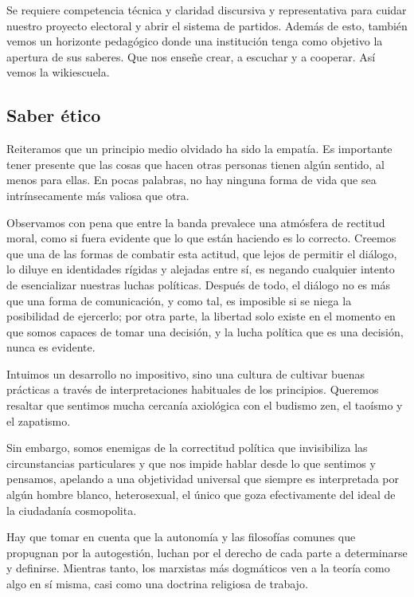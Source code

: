 Se requiere competencia técnica y claridad discursiva y representativa
para cuidar nuestro proyecto electoral y abrir el sistema de partidos.
Además de esto, también vemos un horizonte pedagógico donde una
institución tenga como objetivo la apertura de sus saberes. Que nos
enseñe crear, a escuchar y a cooperar. Así vemos la wikiescuela.

\hypertarget{saber-uxe9tico}{%
\subsection{Saber ético}\label{saber-uxe9tico}}

Reiteramos que un principio medio olvidado ha sido la empatía. Es
importante tener presente que las cosas que hacen otras personas tienen
algún sentido, al menos para ellas. En pocas palabras, no hay ninguna
forma de vida que sea intrínsecamente más valiosa que otra.

Observamos con pena que entre la banda prevalece una atmósfera de
rectitud moral, como si fuera evidente que lo que están haciendo es lo
correcto. Creemos que una de las formas de combatir esta actitud, que
lejos de permitir el diálogo, lo diluye en identidades rígidas y
alejadas entre sí, es negando cualquier intento de esencializar nuestras
luchas políticas. Después de todo, el diálogo no es más que una forma de
comunicación, y como tal, es imposible si se niega la posibilidad de
ejercerlo; por otra parte, la libertad solo existe en el momento en que
somos capaces de tomar una decisión, y la lucha política que es una
decisión, nunca es evidente.

Intuimos un desarrollo no impositivo, sino una cultura de cultivar
buenas prácticas a través de interpretaciones habituales de los
principios. Queremos resaltar que sentimos mucha cercanía axiológica con
el budismo zen, el taoísmo y el zapatismo.

Sin embargo, somos enemigas de la correctitud política que invisibiliza
las circunstancias particulares y que nos impide hablar desde lo que
sentimos y pensamos, apelando a una objetividad universal que siempre es
interpretada por algún hombre blanco, heterosexual, el único que goza
efectivamente del ideal de la ciudadanía cosmopolita.

Hay que tomar en cuenta que la autonomía y las filosofías comunes que
propugnan por la autogestión, luchan por el derecho de cada parte a
determinarse y definirse. Mientras tanto, los marxistas más dogmáticos
ven a la teoría como algo en sí misma, casi como una doctrina religiosa
de trabajo.

